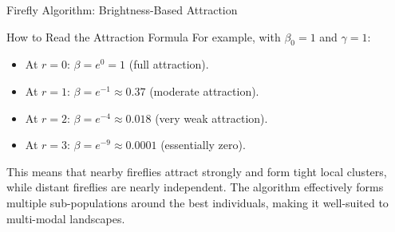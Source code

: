 \documentclass[aspectratio=169,10pt]{beamer}
\begin{document}
\begin{frame}[allowframebreaks]{Firefly Algorithm: Brightness-Based Attraction}
\begin{alertblock}{How to Read the Attraction Formula}
    For example, with $\beta_0 = 1$ and $\gamma = 1$:
    \begin{itemize}
      \item At $r = 0$: $\beta = e^0 = 1$ (full attraction).
      \item At $r = 1$: $\beta = e^{-1} \approx 0.37$ (moderate attraction).
      \item At $r = 2$: $\beta = e^{-4} \approx 0.018$ (very weak attraction).
      \item At $r = 3$: $\beta = e^{-9} \approx 0.0001$ (essentially zero).
    \end{itemize}
    This means that nearby fireflies attract strongly and form tight
    local clusters, while distant fireflies are nearly independent.
    The algorithm effectively forms multiple sub-populations around
    the best individuals, making it well-suited to multi-modal landscapes.
  \end{alertblock}

\end{frame}
\end{document}
